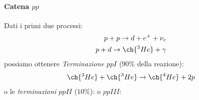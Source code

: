 \paragraph{Catena $pp$}
Dati i primi due processi:
\begin{align*}
  p + p \rightarrow d + e^+ + \nu_e
  \\
  p + d \rightarrow \ch{^{3}He} + \gamma
\end{align*}
possiamo ottenere \textit{Terminazione $ppI$} ($90\%$ della reazione):
\begin{align*}
  \ch{^{3}He} + \ch{^{3}He} \rightarrow \ch{^{4}He} + 2p
\end{align*}
o le \textit{terminazioni $ppII$} ($10\%$):
o $ppIII$:
